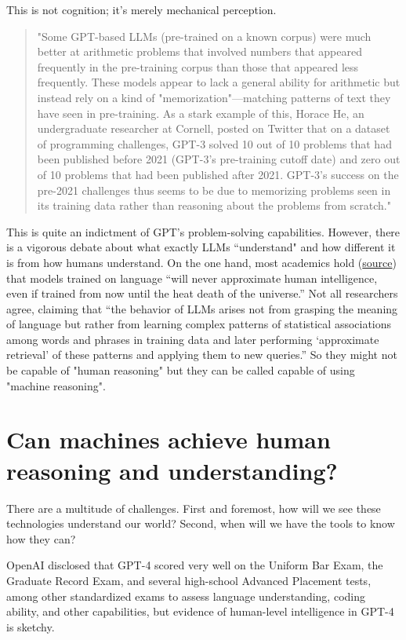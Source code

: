 This is not cognition; it's merely mechanical perception.

\begin{quote}
"Some GPT-based LLMs (pre-trained on a known corpus) were much better at arithmetic problems that involved numbers that appeared frequently in the pre-training corpus than those that appeared less frequently. These models appear to lack a general ability for arithmetic but instead rely on a kind of "memorization"—matching patterns of text they have seen in pre-training. As a stark example of this, Horace He, an undergraduate researcher at Cornell, posted on Twitter that on a dataset of programming challenges, GPT-3 solved 10 out of 10 problems that had been published before 2021 (GPT-3's pre-training cutoff date) and zero out of 10 problems that had been published after 2021. GPT-3's success on the pre-2021 challenges thus seems to be due to memorizing problems seen in its training data rather than reasoning about the problems from scratch."
\end{quote}

This is quite an indictment of GPT’s problem-solving capabilities. However, there is a vigorous debate about what exactly LLMs “understand" and how different it is from how humans understand. On the one hand, most academics hold (\href{https://www.science.org/doi/10.1126/science.adj5957}{source}) that models trained on language “will never approximate human intelligence, even if trained from now until the heat death of the universe.” Not all researchers agree, claiming that “the behavior of LLMs arises not from grasping the meaning of language but rather from learning complex patterns of statistical associations among words and phrases in training data and later performing ‘approximate retrieval’ of these patterns and applying them to new queries.” So they might not be capable of "human reasoning" but they can be called capable of using "machine reasoning".

\section*{Can machines achieve human reasoning and understanding?}

There are a multitude of challenges. First and foremost, how will we see these technologies understand our world? Second, when will we have the tools to know how they can?

OpenAI disclosed that GPT-4 scored very well on the Uniform Bar Exam, the Graduate Record Exam, and several high-school Advanced Placement tests, among other standardized exams to assess language understanding, coding ability, and other capabilities, but evidence of human-level intelligence in GPT-4 is sketchy.

